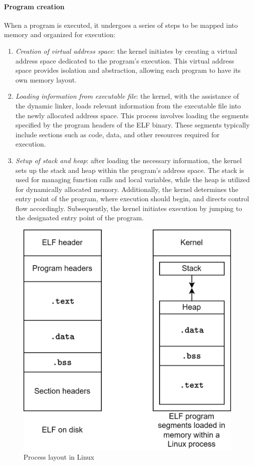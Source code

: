 \paragraph*{Program creation}
When a program is executed, it undergoes a series of steps to be mapped into memory and organized for execution:
\begin{enumerate}
    \item \textit{Creation of virtual address space}: the kernel initiates by creating a virtual address space dedicated to the program's execution.
        This virtual address space provides isolation and abstraction, allowing each program to have its own memory layout.
    \item \textit{Loading information from executable file}: the kernel, with the assistance of the dynamic linker, loads relevant information from the executable file into the newly allocated address space. 
        This process involves loading the segments specified by the program headers of the ELF binary. 
        These segments typically include sections such as code, data, and other resources required for execution.
    \item \textit{Setup of stack and heap}: after loading the necessary information, the kernel sets up the stack and heap within the program's address space. 
        The stack is used for managing function calls and local variables, while the heap is utilized for dynamically allocated memory. 
        Additionally, the kernel determines the entry point of the program, where execution should begin, and directs control flow accordingly.
        Subsequently, the kernel initiates execution by jumping to the designated entry point of the program.
\end{enumerate}
\begin{figure}[H]
    \centering
    \includegraphics[width=0.6\linewidth]{images/linux.png}
    \caption{Process layout in Linux}
\end{figure}

